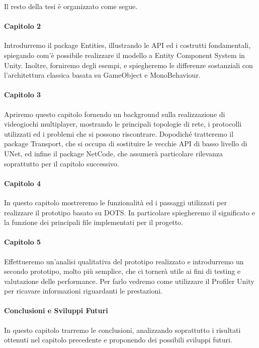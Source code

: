 Il resto della tesi è organizzato come segue.

\paragraph{Capitolo 2}
Introdurremo il package Entities, illustrando le API ed i costrutti fondamentali, spiegando com'è possibile realizzare il modello a Entity Component System in Unity. Inoltre, forniremo degli esempi, e spiegheremo le differenze sostanziali con l'architettura classica basata su GameObject e MonoBehaviour.

\paragraph{Capitolo 3}
Apriremo questo capitolo fornendo un background sulla realizzazione di videogiochi multiplayer, mostrando le principali topologie di rete, i protocolli utilizzati ed i problemi che si possono riscontrare. Dopodiché tratteremo il package Transport, che si occupa di sostituire le vecchie API di basso livello di UNet, ed infine il package NetCode, che assumerà particolare rilevanza soprattutto per il capitolo successivo.

\paragraph{Capitolo 4}
In questo capitolo mostreremo le funzionalità ed i passaggi utilizzati per realizzare il prototipo basato su DOTS. In particolare spiegheremo il significato e la funzione dei principali file implementati per il progetto.

\paragraph{Capitolo 5}
Effettueremo un'analisi qualitativa del prototipo realizzato e introdurremo un secondo prototipo, molto più semplice, che ci tornerà utile ai fini di testing e valutazione delle performance. Per farlo vedremo come utilizzare il Profiler Unity per ricavare informazioni riguardanti le prestazioni. 

\paragraph{Conclusioni e Sviluppi Futuri}
In questo capitolo trarremo le conclusioni, analizzando soprattutto i risultati ottenuti nel capitolo precedente e proponendo dei possibili sviluppi futuri.